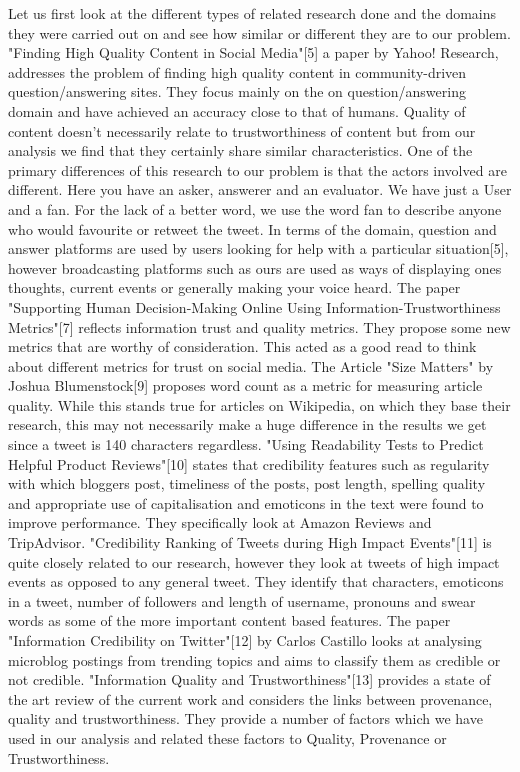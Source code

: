 Let us first look at the different types of related research done and the domains they were carried out on and see how similar or different they are to our problem. "Finding High Quality Content in Social Media"[5] a paper by Yahoo! Research, addresses the problem of finding high quality content in community-driven question/answering sites. They focus mainly on the on question/answering domain and have achieved an accuracy close to that of humans. Quality of content doesn't necessarily relate to trustworthiness of content but from our analysis we find that they certainly share similar characteristics. One of the primary differences of this research to our problem is that the actors involved are different. Here you have an asker, answerer and an evaluator. We have just a User and a fan. For the lack of a better word, we use the word fan to describe anyone who would favourite or retweet the tweet. In terms of the domain, question and answer platforms are used by users looking for help with a particular situation[5], however broadcasting platforms such as ours are used as ways of displaying ones thoughts, current events or generally making your voice heard. The paper "Supporting Human Decision-Making Online Using Information-Trustworthiness Metrics"[7] reflects information trust and quality metrics. They propose some new metrics that are worthy of consideration. This acted as a good read to think about different metrics for trust on social media. The Article "Size Matters" by Joshua Blumenstock[9] proposes word count as a metric for measuring article quality. While this stands true for articles on Wikipedia, on which they base their research, this may not necessarily make a huge difference in the results we get since a tweet is 140 characters regardless. "Using Readability Tests to Predict Helpful Product Reviews"[10] states that credibility features such as regularity with which bloggers post, timeliness of the posts, post length, spelling quality and appropriate use of capitalisation and emoticons in the text were found to improve performance. They specifically look at Amazon Reviews and TripAdvisor. "Credibility Ranking of Tweets during High Impact Events"[11] is quite closely related to our research, however they look at tweets of high impact events as opposed to any general tweet. They identify that characters, emoticons in a tweet, number of followers and length of username, pronouns and swear words as some of the more important content based features. The paper "Information Credibility on Twitter"[12] by Carlos Castillo looks at analysing microblog postings from trending topics and aims to classify them as credible or not credible. "Information Quality and Trustworthiness"[13] provides a state of the art review of the current work and considers the links between provenance, quality and trustworthiness. They provide a number of factors which we have used in our analysis and related these factors to Quality, Provenance or Trustworthiness. 
